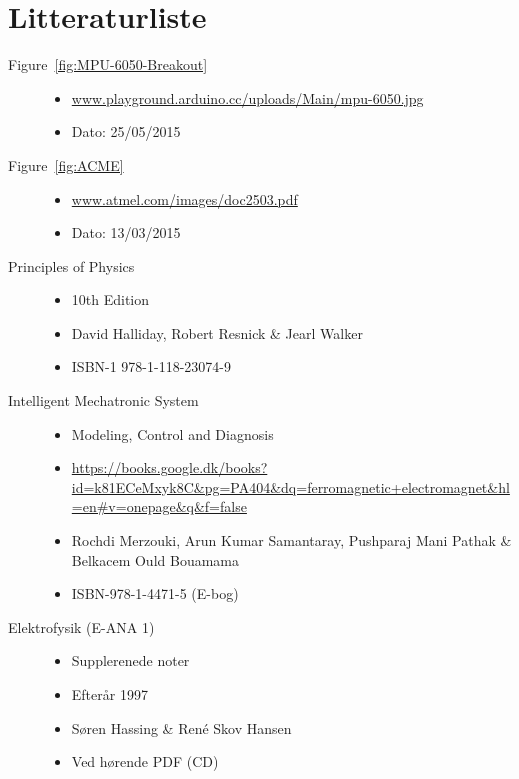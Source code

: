 \section{Litteraturliste}

\begin{description}
	\item[Figure~\ref{fig:MPU-6050-Breakout}] \hfill
		\begin{itemize}
			\item \url{www.playground.arduino.cc/uploads/Main/mpu-6050.jpg}
			\item Dato: 25/05/2015
		\end{itemize}

	\item[Figure~\ref{fig:ACME}] \hfill
		\begin{itemize}
			\item \url{www.atmel.com/images/doc2503.pdf}
			\item Dato: 13/03/2015
		\end{itemize}
		
		\item[Principles of Physics] \hfill
		\begin{itemize}
			\item 10th Edition
			\item David Halliday, Robert Resnick \& Jearl Walker
			\item ISBN-1 978-1-118-23074-9
		\end{itemize}
		
		\item[Intelligent Mechatronic System] \hfill
		\begin{itemize}
			\item Modeling, Control and Diagnosis	
			\item \url{https://books.google.dk/books?id=k81ECeMxyk8C&pg=PA404&dq=ferromagnetic+electromagnet&hl=en#v=onepage&q&f=false}
			\item Rochdi Merzouki, Arun Kumar Samantaray, Pushparaj Mani Pathak \& Belkacem Ould 	 Bouamama
			\item ISBN-978-1-4471-5 (E-bog)
		\end{itemize}
		
		\item[Elektrofysik (E-ANA 1)] \hfill
		\begin{itemize}
			\item Supplerenede noter
			\item Efterår 1997
			\item Søren Hassing \& René Skov Hansen
			\item Ved hørende PDF (CD)
		\end{itemize}
		

\end{description}
